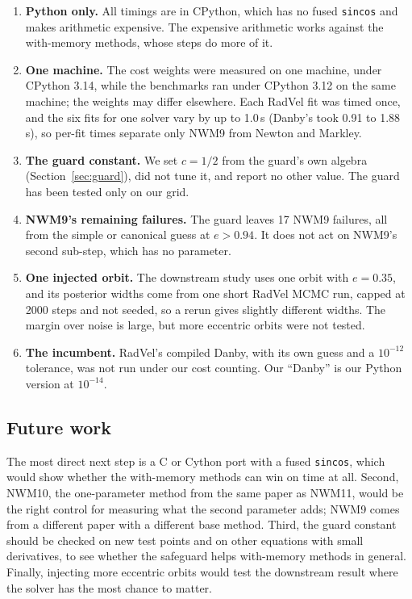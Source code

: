 \documentclass[sigconf,nonacm]{acmart}
\begin{document}
\begin{enumerate}
\item \textbf{Python only.} All timings are in CPython, which has no fused
      \texttt{sincos} and makes arithmetic expensive. The expensive arithmetic
      works against the with-memory methods, whose steps do more of it.
\item \textbf{One machine.} The cost weights were measured on one machine,
      under CPython 3.14, while the benchmarks ran under CPython 3.12 on
      the same machine; the weights may differ elsewhere. Each RadVel fit was timed once, and
      the six fits for one solver vary by up to 1.0\,s (Danby's took
      0.91 to 1.88\,s), so per-fit times separate only NWM9 from Newton
      and Markley.
\item \textbf{The guard constant.} We set $c = 1/2$ from the guard's
      own algebra (Section~\ref{sec:guard}), did not tune it, and report
      no other value. The guard has been tested only on our grid.
\item \textbf{NWM9's remaining failures.} The guard leaves 17 NWM9
      failures, all from the simple or canonical guess at $e > 0.94$. It
      does not act on NWM9's second sub-step, which has no parameter.
\item \textbf{One injected orbit.} The downstream study uses one orbit
      with $e = 0.35$, and its posterior widths come from one short
      RadVel MCMC run, capped at 2000 steps and not seeded, so a rerun
      gives slightly different widths. The margin over noise is large, but more eccentric
      orbits were not tested.
\item \textbf{The incumbent.} RadVel's compiled Danby, with its own guess
      and a $10^{-12}$ tolerance, was not run under our cost counting. Our
      ``Danby'' is our Python version at $10^{-14}$.
\end{enumerate}

\subsection{Future work}

The most direct next step is a C or Cython port with a fused
\texttt{sincos}, which would show whether the with-memory methods can
win on time at all.
Second, NWM10, the one-parameter method from the same paper as NWM11,
would be the right control for measuring what the second parameter adds;
NWM9 comes from a different paper with a different base method. Third,
the guard constant should be checked on new test points and on other
equations with small derivatives, to see whether the safeguard helps
with-memory methods in general. Finally, injecting more eccentric orbits
would test the downstream result where the solver has the most chance to
matter.
\end{document}
